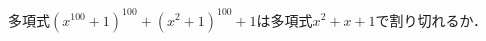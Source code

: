 \documentclass[../../main.tex]{subfiles}
\begin{document}
多項式$(x^{100}+1)^{100}+(x^2+1)^{100}+1$は多項式$x^2+x+1$で割り切れるか．
\end{document}
